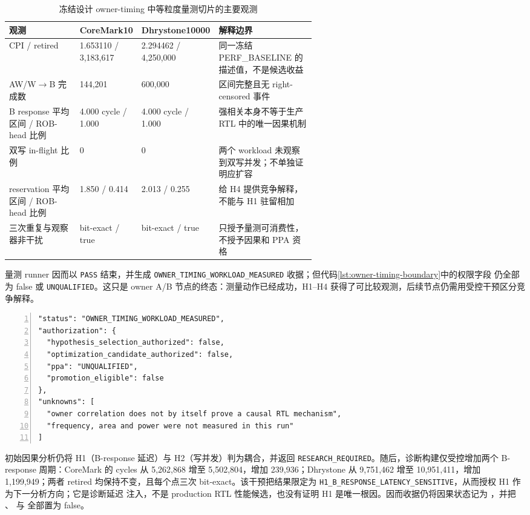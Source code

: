 \documentclass[UTF8,a4paper,zihao=-4,oneside]{ctexart}
\newcommand{\statusword}[1]{\texttt{#1}}
\begin{document}
\begin{table}[H]
  \centering
  \small
  \setlength{\tabcolsep}{3pt}
  \renewcommand{\arraystretch}{0.94}
  \caption{冻结设计 owner-timing 中等粒度量测切片的主要观测}
  \label{tab:owner-timing-current-slice}
  \begin{tabularx}{\linewidth}{@{}L{0.23\linewidth}C{0.18\linewidth}C{0.18\linewidth}Y@{}}
    \toprule
    观测 & CoreMark10 & Dhrystone10000 & 解释边界 \\
    \midrule
    CPI / retired & 1.653110 / 3,183,617 & 2.294462 / 4,250,000 & 同一冻结 PERF\_BASELINE 的描述值，不是候选收益 \\
    AW/W$\rightarrow$B 完成数 & 144,201 & 600,000 & 区间完整且无 right-censored 事件 \\
    B response 平均区间 / ROB-head 比例 & 4.000 cycle / 1.000 & 4.000 cycle / 1.000 & 强相关本身不等于生产 RTL 中的唯一因果机制 \\
    双写 in-flight 比例 & 0 & 0 & 两个 workload 未观察到双写并发；不单独证明应扩容 \\
    reservation 平均区间 / ROB-head 比例 & 1.850 / 0.414 & 2.013 / 0.255 & 给 H4 提供竞争解释，不能与 H1 驻留相加 \\
    三次重复与观察器非干扰 & bit-exact / true & bit-exact / true & 只授予量测可消费性，不授予因果和 PPA 资格 \\
    \bottomrule
  \end{tabularx}
\end{table}

量测 runner 因而以 \statusword{PASS} 结束，并生成
\statusword{OWNER\_TIMING\_WORKLOAD\_MEASURED} 收据；但代码\ref{lst:owner-timing-boundary}中的权限字段
仍全部为 false 或 \statusword{UNQUALIFIED}。这只是 owner A/B 节点的终态：测量动作已经成功，H1--H4
获得了可比较观测，后续节点仍需用受控干预区分竞争解释。

\begin{lstlisting}[language={},numbers=left,
  caption={初始 owner-timing A/B 收据的授权边界},
  label={lst:owner-timing-boundary}]
"status": "OWNER_TIMING_WORKLOAD_MEASURED",
"authorization": {
  "hypothesis_selection_authorized": false,
  "optimization_candidate_authorized": false,
  "ppa": "UNQUALIFIED",
  "promotion_eligible": false
},
"unknowns": [
  "owner correlation does not by itself prove a causal RTL mechanism",
  "frequency, area and power were not measured in this run"
]
\end{lstlisting}

初始因果分析仍将 H1（B-response 延迟）与 H2（写并发）判为耦合，并返回
\statusword{RESEARCH\_REQUIRED}。随后，诊断构建仅受控增加两个 B-response 周期：CoreMark 的
cycles 从 5,262,868 增至 5,502,804，增加 239,936；Dhrystone 从 9,751,462 增至 10,951,411，增加
1,199,949；两者 retired 均保持不变，且每个点三次 bit-exact。该干预把结果限定为
\statusword{H1\_B\_RESPONSE\_LATENCY\_SENSITIVE}，从而授权 H1 作为下一分析方向；它是诊断延迟
注入，不是 production RTL 性能候选，也没有证明 H1 是唯一根因。因而收据仍将因果状态记为
，并把
、
 与
 全部置为 false。
\end{document}
